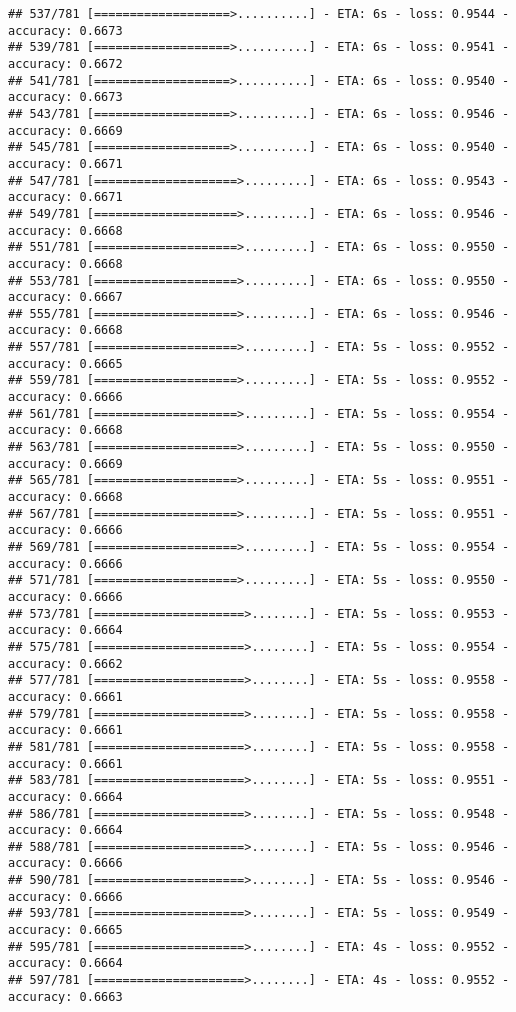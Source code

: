 \documentclass[
]{article}
\begin{document}
\begin{verbatim}
## 537/781 [===================>..........] - ETA: 6s - loss: 0.9544 - accuracy: 0.6673
## 539/781 [===================>..........] - ETA: 6s - loss: 0.9541 - accuracy: 0.6672
## 541/781 [===================>..........] - ETA: 6s - loss: 0.9540 - accuracy: 0.6673
## 543/781 [===================>..........] - ETA: 6s - loss: 0.9546 - accuracy: 0.6669
## 545/781 [===================>..........] - ETA: 6s - loss: 0.9540 - accuracy: 0.6671
## 547/781 [====================>.........] - ETA: 6s - loss: 0.9543 - accuracy: 0.6671
## 549/781 [====================>.........] - ETA: 6s - loss: 0.9546 - accuracy: 0.6668
## 551/781 [====================>.........] - ETA: 6s - loss: 0.9550 - accuracy: 0.6668
## 553/781 [====================>.........] - ETA: 6s - loss: 0.9550 - accuracy: 0.6667
## 555/781 [====================>.........] - ETA: 6s - loss: 0.9546 - accuracy: 0.6668
## 557/781 [====================>.........] - ETA: 5s - loss: 0.9552 - accuracy: 0.6665
## 559/781 [====================>.........] - ETA: 5s - loss: 0.9552 - accuracy: 0.6666
## 561/781 [====================>.........] - ETA: 5s - loss: 0.9554 - accuracy: 0.6668
## 563/781 [====================>.........] - ETA: 5s - loss: 0.9550 - accuracy: 0.6669
## 565/781 [====================>.........] - ETA: 5s - loss: 0.9551 - accuracy: 0.6668
## 567/781 [====================>.........] - ETA: 5s - loss: 0.9551 - accuracy: 0.6666
## 569/781 [====================>.........] - ETA: 5s - loss: 0.9554 - accuracy: 0.6666
## 571/781 [====================>.........] - ETA: 5s - loss: 0.9550 - accuracy: 0.6666
## 573/781 [=====================>........] - ETA: 5s - loss: 0.9553 - accuracy: 0.6664
## 575/781 [=====================>........] - ETA: 5s - loss: 0.9554 - accuracy: 0.6662
## 577/781 [=====================>........] - ETA: 5s - loss: 0.9558 - accuracy: 0.6661
## 579/781 [=====================>........] - ETA: 5s - loss: 0.9558 - accuracy: 0.6661
## 581/781 [=====================>........] - ETA: 5s - loss: 0.9558 - accuracy: 0.6661
## 583/781 [=====================>........] - ETA: 5s - loss: 0.9551 - accuracy: 0.6664
## 586/781 [=====================>........] - ETA: 5s - loss: 0.9548 - accuracy: 0.6664
## 588/781 [=====================>........] - ETA: 5s - loss: 0.9546 - accuracy: 0.6666
## 590/781 [=====================>........] - ETA: 5s - loss: 0.9546 - accuracy: 0.6666
## 593/781 [=====================>........] - ETA: 5s - loss: 0.9549 - accuracy: 0.6665
## 595/781 [=====================>........] - ETA: 4s - loss: 0.9552 - accuracy: 0.6664
## 597/781 [=====================>........] - ETA: 4s - loss: 0.9552 - accuracy: 0.6663

\end{verbatim}
\end{document}
